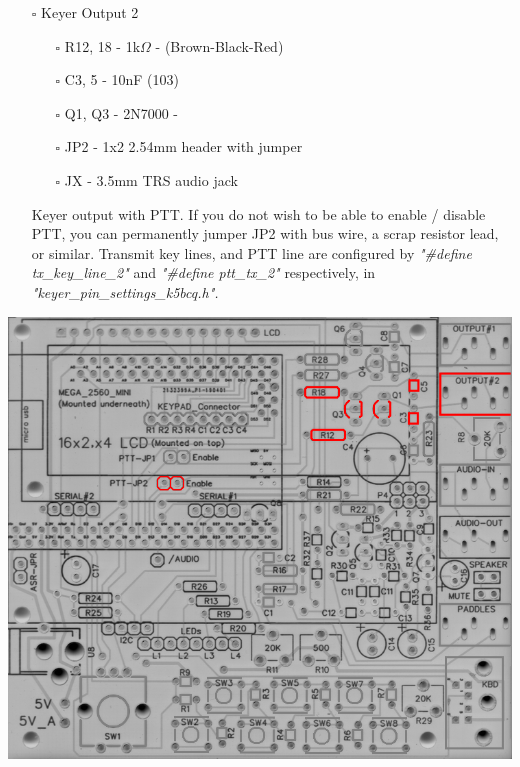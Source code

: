 \documentclass[11pt]{article}
\begin{document}
\newpage
\begin{itemize}
\item[{$\square$}] Keyer Output 2
\begin{itemize}
\item[{$\square$}] R12, 18 - 1k\(\Omega\) - (Brown-Black-Red)
\item[{$\square$}] C3, 5 - 10nF (103)
\item[{$\square$}] Q1, Q3 - 2N7000 -
\item[{$\square$}] JP2 - 1x2 2.54mm header with jumper
\item[{$\square$}] JX - 3.5mm TRS audio jack
\end{itemize}

Keyer output with PTT.  If you do not wish to be able to enable / disable PTT, you can permanently jumper JP2 with bus wire, a scrap resistor lead, or similar.  Transmit key lines, and PTT line are configured by \emph{"\#define tx\_key\_line\_2"} and \emph{"\#define ptt\_tx\_2"} respectively, in \emph{"keyer\_pin\_settings\_k5bcq.h".}
\end{itemize}
\begin{center}
\includegraphics[width=.9\linewidth]{../png/3.3/pcb-top-keyer-output-2.png}
\end{center}
\end{document}

